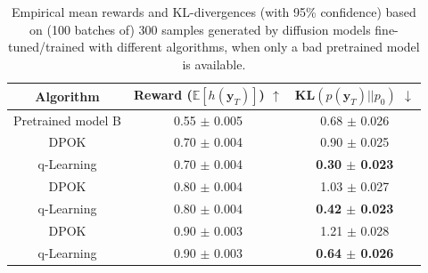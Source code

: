 \documentclass[11pt]{article}
\begin{document}
\begin{table}[h]
	\centering
	\begin{tabular}{c | c c }
		\hline Algorithm & Reward ($\mathbb{E}[h(\mathbf{y}_T)]$) $\uparrow$& KL$(p(\mathbf{y}_T) || p_0)$ $\downarrow$\\\hline
		Pretrained model B &  0.55 $\pm$ 0.005 & 0.68 $\pm$ 0.026  \\\hline\hline
		DPOK &  0.70 $\pm$ 0.004 &  0.90 $\pm$ 0.025 \\				
		q-Learning  & 0.70 $\pm$ 0.004& \textbf{0.30 $\pm$ 0.023} \\ \hline
		DPOK  & 0.80 $\pm$ 0.004 & 1.03 $\pm$ 0.027\\				
		q-Learning    & 0.80 $\pm$ 0.004& \textbf{0.42 $\pm$ 0.023}  \\\hline
		DPOK &  0.90 $\pm$ 0.003 &  1.21 $\pm$ 0.028 \\				
		q-Learning  & 0.90 $\pm$ 0.003& \textbf{0.64 $\pm$ 0.026} \\ \hline
		
	\end{tabular}
	\caption{Empirical mean rewards and KL-divergences (with 95\% confidence) based on (100 batches of) 300 samples generated by diffusion models fine-tuned/trained with different algorithms, when only a bad pretrained model is available. }
	\label{table:pretrain_cmp_bad}
\end{table}
\end{document}

